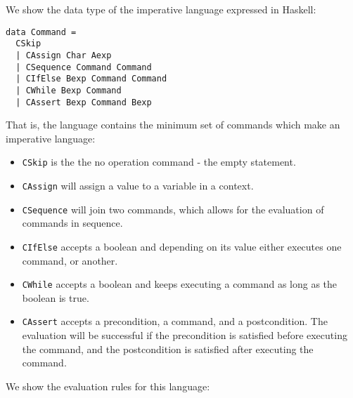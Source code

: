 \documentclass{article}
\theoremstyle{definition}
\begin{document}
We show the data type of the imperative language expressed in Haskell:

\begin{lstlisting}
data Command =
  CSkip
  | CAssign Char Aexp
  | CSequence Command Command
  | CIfElse Bexp Command Command
  | CWhile Bexp Command
  | CAssert Bexp Command Bexp
\end{lstlisting}

That is, the language contains the minimum set of commands which make an imperative language:

\begin{itemize}
\item \texttt{CSkip} is the the no operation command - the empty statement.
\item \texttt{CAssign} will assign a value to a variable in a context.
\item \texttt{CSequence} will join two commands, which allows for the evaluation of commands in sequence.
\item \texttt{CIfElse} accepts a boolean and depending on its value either executes one command, or another.
\item \texttt{CWhile} accepts a boolean and keeps executing a command as long as the boolean is true.
\item \texttt{CAssert} accepts a precondition, a command, and a postcondition. The evaluation will be successful if the precondition is satisfied before executing the command, and the postcondition is satisfied after executing the command.
\end{itemize}

We show the evaluation rules for this language:
\end{document}
